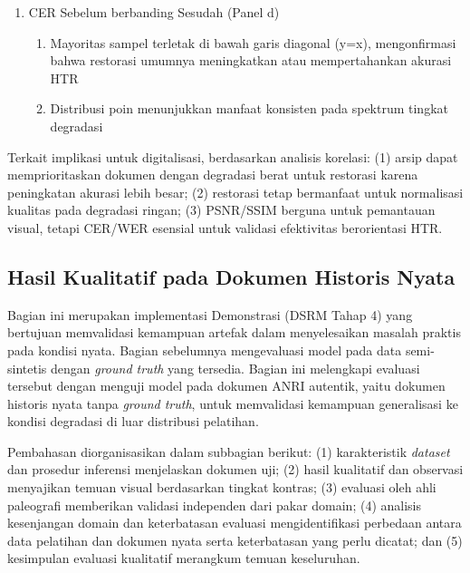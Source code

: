 \begin{enumerate}[leftmargin=1.5em, labelsep=0.5em, itemindent=0pt, label=\arabic*., topsep=0pt, partopsep=0pt]
    \item CER Sebelum berbanding Sesudah (Panel d)
    
    \begin{enumerate}[leftmargin=1.5em, labelsep=0.5em, itemindent=0pt, noitemsep, topsep=0pt, label=\alph*)]
        \item Mayoritas sampel terletak di bawah garis diagonal (y=x), mengonfirmasi bahwa restorasi umumnya meningkatkan atau mempertahankan akurasi HTR
        \item Distribusi poin menunjukkan manfaat konsisten pada spektrum tingkat degradasi
    \end{enumerate}
\end{enumerate}

Terkait implikasi untuk digitalisasi, berdasarkan analisis korelasi: (1) arsip dapat memprioritaskan dokumen dengan degradasi berat untuk restorasi karena peningkatan akurasi lebih besar; (2) restorasi tetap bermanfaat untuk normalisasi kualitas pada degradasi ringan; (3) PSNR/SSIM berguna untuk pemantauan visual, tetapi CER/WER esensial untuk validasi efektivitas berorientasi HTR.


\subsection{Hasil Kualitatif pada Dokumen Historis Nyata}
\label{subsec:evaluasi-kualitatif-anri}

Bagian ini merupakan implementasi Demonstrasi (DSRM Tahap 4) yang bertujuan memvalidasi kemampuan artefak dalam menyelesaikan masalah praktis pada kondisi nyata. Bagian sebelumnya mengevaluasi model pada data semi-sintetis dengan \textit{ground truth} yang tersedia. Bagian ini melengkapi evaluasi tersebut dengan menguji model pada dokumen ANRI autentik, yaitu dokumen historis nyata tanpa \textit{ground truth}, untuk memvalidasi kemampuan generalisasi ke kondisi degradasi di luar distribusi pelatihan.

Pembahasan diorganisasikan dalam subbagian berikut: (1) karakteristik \textit{dataset} dan prosedur inferensi menjelaskan dokumen uji; (2) hasil kualitatif dan observasi menyajikan temuan visual berdasarkan tingkat kontras; (3) evaluasi oleh ahli paleografi memberikan validasi independen dari pakar domain; (4) analisis kesenjangan domain dan keterbatasan evaluasi mengidentifikasi perbedaan antara data pelatihan dan dokumen nyata serta keterbatasan yang perlu dicatat; dan (5) kesimpulan evaluasi kualitatif merangkum temuan keseluruhan.

